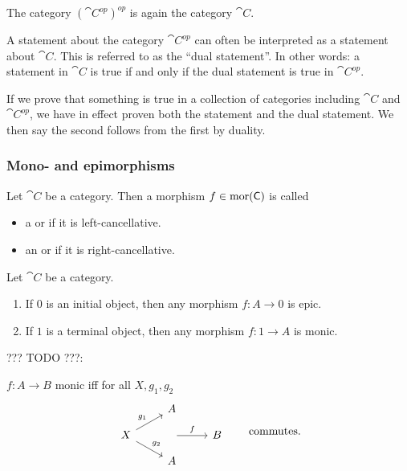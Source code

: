 \begin{lemma}
The category $(\cat{C}^{op})^{op}$ is again the category $\cat{C}$.
\end{lemma}


A statement about the category $\cat{C^{op}}$ can often be interpreted as a statement about $\cat{C}$. This is referred to as the ``dual statement''. In other words: a statement in $\cat{C}$ is true if and only if the dual statement is true in $\cat{C^{op}}$.

If we prove that something is true in a collection of categories including $\cat{C}$ and $\cat{C^{op}}$, we have in effect proven both the statement and the dual statement. We then say the second follows from the first by duality.


\subsubsection{Mono- and epimorphisms}
\begin{definition}
Let $\cat{C}$ be a category. Then a morphism $f \in \operatorname{mor}(\mathsf{C})$ is called
\begin{itemize}
\item a  or  if it is left-cancellative.
\item an  or  if it is right-cancellative.
\end{itemize}
\end{definition}

\begin{lemma}
Let $\cat{C}$ be a category.
\begin{enumerate}
\item If $0$ is an initial object, then any morphism $f: A\to 0$ is epic.
\item If $1$ is a terminal object, then any morphism $f: 1\to A$ is monic.
\end{enumerate}
\end{lemma}

??? TODO ???:

$f: A\to B$ monic iff for all $X, g_1, g_2$
\[ \begin{tikzcd}[row sep=small]
& A & \\
X \arrow[ur, "g_1"] \arrow[dr, "g_2"] & \arrow[r, "f"] & B \\
& A  &
\end{tikzcd} \qquad \text{commutes.} \]

